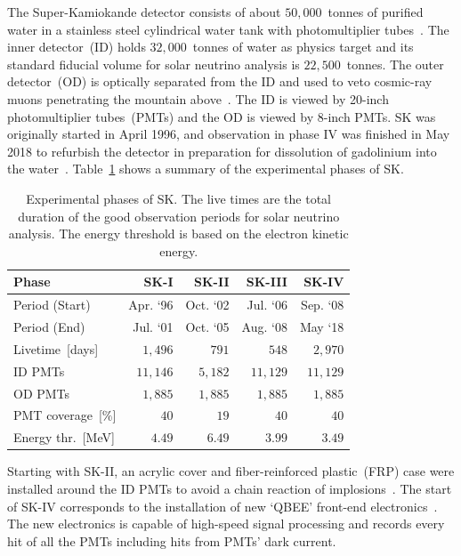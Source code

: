 \documentclass[aps,prd,reprint,superscriptaddress,floatfix,altaffilletter,nofootinbib]{revtex4-2}
\begin{document}
The Super-Kamiokande detector consists of about $50,000$~tonnes 
of purified water in a stainless steel cylindrical water tank with
photomultiplier tubes~\cite{Fukuda:2002uc}. The inner detector~(ID) holds
$32,000$~tonnes of water as physics target and its standard fiducial volume
for solar neutrino analysis is $22,500$~tonnes.
The outer detector~(OD) is optically separated
from the ID and used to veto cosmic-ray muons penetrating the
mountain above~\cite{Abe:2013gga}.
The ID is viewed by 20-inch photomultiplier tubes~(PMTs) and
the OD is viewed by 8-inch PMTs.
SK was originally started in April 1996, and observation in phase IV was
finished in May 2018 to refurbish the detector in preparation for dissolution of gadolinium into the water~\cite{Super-Kamiokande:2021cuo}.
Table~\ref{tb:phase} shows a summary of the experimental phases of SK.
\begin{table}[htp]
    \begin{center}
    \caption{Experimental phases of SK. The live times are the total duration of the good observation periods for solar neutrino analysis. The energy threshold is based on the electron kinetic energy.} 
    \label{tb:phase}
        \begin{tabular}{lrrrr}
        \hline
        \hline
        Phase & SK-I & SK-II & SK-III & SK-IV \\ \hline 
        Period (Start) & Apr. `96 & Oct. `02 & Jul. `06 & Sep. `08\\
        Period (End) & Jul. `01 & Oct. `05 & Aug. `08 & May `18 \\
        Livetime~[days] & $1,496$ & $791$ & $548$ & $2,970$ \\      
        ID PMTs & $11,146$ & $5,182$ & $11,129$ & $11,129$ \\  
        OD PMTs & $1,885$ & $1,885$ & $1,885$ & $1,885$ \\
        PMT coverage~[$\%$] & $40$ & $19$ & $40$ & $40$ \\
        Energy thr.~[MeV] & $4.49$ & $6.49$ & $3.99$ & $3.49$ \\
        \hline
        \hline
        \end{tabular}
    \end{center}
\end{table}
Starting with SK-II, an acrylic cover and fiber-reinforced plastic~(FRP) case were installed around the ID PMTs to avoid a chain reaction of implosions~\cite{Cravens:2008aa}. The start of SK-IV corresponds to the installation of new `QBEE' front-end electronics~\cite{Nishino:2009zu,Yamada:2010zzc}.  The new electronics is capable of high-speed signal processing and records every hit of all the PMTs including hits from PMTs' dark current. 
\end{document}
